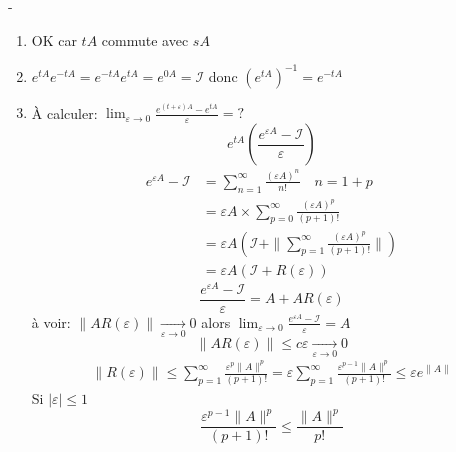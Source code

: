 \begin{preuve}-
    \begin{enumerate}
        \item OK car $tA$ commute avec  $sA$
        \item  $e^{tA}e^{-tA} = e^{-tA}e^{tA} = e^{0A} = \mathcal{I}$ donc  $(e^{tA})^{-1} = e^{-tA}$
        \item À calculer: $\lim_{\varepsilon \to 0} \frac{e^{(t + \varepsilon)A} - e^{tA}}{\varepsilon} = ?$ 
            \[
            e^{tA}(\frac{e^{\varepsilon A }- \mathcal{I}}{\varepsilon})
            \] 
            \begin{align*}
                e^{\varepsilon A} - \mathcal{I} &= \sum_{n=1}^{\infty} \frac{(\varepsilon A)^n}{n!} \quad n = 1 + p\\
                                                &= \varepsilon A \times \sum_{p=0}^{\infty} \frac{(\varepsilon A)^p}{(p+1)!}\\
                                                &= \varepsilon A \left( \mathcal{I} + \|\sum_{p=1}^{\infty} \frac{(\varepsilon A)^p}{(p+1)!}\| \right) \\
                                                &= \varepsilon A \left( \mathcal{I} + R(\varepsilon) \right) 
            \end{align*}
            \[
                \frac{e^{\varepsilon A} - \mathcal{I}}{\varepsilon} = A + AR(\varepsilon)
            \] 
            à voir: $\|AR(\varepsilon)\| \xrightarrow[\varepsilon \to 0]{} 0$ alors $\lim_{\varepsilon \to 0} \frac{e^{\varepsilon A} - \mathcal{I}}{\varepsilon} = A$
            \[
            \|AR(\varepsilon)\| \le c\varepsilon \xrightarrow[\varepsilon \to 0]{} 0
            \] 
            \begin{align*}
                \|R(\varepsilon)\| \le \sum_{p=1}^{\infty} \frac{\varepsilon^p \|A\|^p}{(p+1)!} = \varepsilon \sum_{p=1}^{\infty} \frac{\varepsilon^{p-1}\|A\|^p}{(p+1)!} \le \varepsilon e^{\|A\|}
            \end{align*}
            Si $|\varepsilon| \le 1$
            \[
                \frac{\varepsilon^{p-1} \|A\|^p}{(p+1)!} \le \frac{\|A\|^p}{p!}
            \] 
    \end{enumerate}
\end{preuve}
